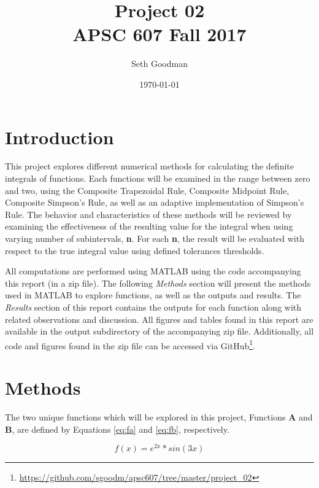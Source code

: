 \documentclass[a4paper]{article}
\title{
	Project 02 \\
	\bigskip
	\normalsize APSC 607 Fall 2017
}
\author{Seth Goodman}
\date{\today}
\begin{document}
\maketitle



\section{Introduction}
\label{sec:introduction}

This project explores different numerical methods for calculating the definite integrals of functions. Each functions will be examined in the range between zero and two, using the Composite Trapezoidal Rule, Composite Midpoint Rule, Composite Simpson’s Rule, as well as an adaptive implementation of Simpson’s Rule. The behavior and characteristics of these methods will be reviewed by examining the effectiveness of the resulting value for the integral when using varying number of subintervals, \textbf{n}. For each \textbf{n}, the result will be evaluated with respect to the true integral value using defined tolerances thresholds. 

All computations are performed using MATLAB using the code accompanying this report (in a zip file). The following \textit{Methods} section will present the methods used in MATLAB to explore functions, as well as the outputs and results. The \textit{Results} section of this report contains the outputs for each function along with related observations and discussion. All figures and tables found in this report are available in the output subdirectory of the accompanying zip file. Additionally, all code and figures found in the zip file can be accessed via GitHub\footnote{\url{https://github.com/sgoodm/apsc607/tree/master/project_02}}.



\newpage
\section{Methods}
\label{sec:methods}

The two unique functions which will be explored in this project, Functions \textbf{A} and \textbf{B}, are defined by Equations \ref{eq:fa} and \ref{eq:fb}, respectively. 

\begin{equation}
f(x) = e^{2x} * sin(3x)
\label{eq:fa}
\end{equation}
\end{document}
